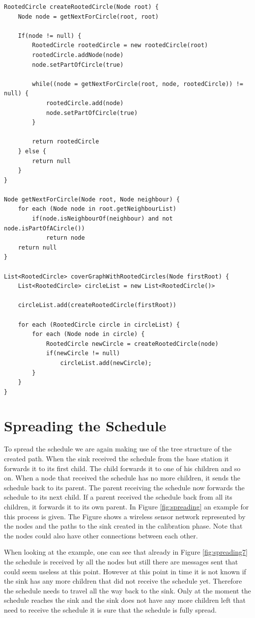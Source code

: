 \begin{lstlisting}
RootedCircle createRootedCircle(Node root) {
	Node node = getNextForCircle(root, root)	

	If(node != null) {
		RootedCircle rootedCircle = new rootedCircle(root)
		rootedCircle.addNode(node)
		node.setPartOfCircle(true)

		while((node = getNextForCircle(root, node, rootedCircle)) != null) {
			rootedCircle.add(node)
			node.setPartOfCircle(true)
		}

		return rootedCircle
	} else {
		return null
	}
}

Node getNextForCircle(Node root, Node neighbour) {
	for each (Node node in root.getNeighbourList)	
		if(node.isNeighbourOf(neighbour) and not node.isPartOfACircle())
			return node
	return null
}

List<RootedCircle> coverGraphWithRootedCircles(Node firstRoot) {
	List<RootedCircle> circleList = new List<RootedCircle()>
	
	circleList.add(createRootedCircle(firstRoot))

	for each (RootedCircle circle in circleList) {
		for each (Node node in circle) {
			RootedCircle newCircle = createRootedCircle(node)
			if(newCircle != null)
				circleList.add(newCircle);
		}
	}
}
\end{lstlisting}

\section{Spreading the Schedule}
\label{chp:apr_spreadingSchedule}
To spread the schedule we are again making use of the tree structure of the created path. When the sink received the schedule from the base station it forwards it to its first child. The child forwards it to one of his children and so on. When a node that received the schedule has no more children, it sends the schedule back to its parent. The parent receiving the schedule now forwards the schedule to its next child. If a parent received the schedule back from all its children, it forwards it to its own parent. In Figure \ref{fig:spreading} an example for this process is given. The Figure shows a wireless sensor network represented by the nodes and the paths to the sink created in the calibration phase. Note that the nodes could also have other connections between each other. 

When looking at the example, one can see that already in Figure \ref{fig:spreading7} the schedule is received by all the nodes but still there are messages sent that could seem useless at this point. However at this point in time it is not known if the sink has any more children that did not receive the schedule yet. Therefore the schedule needs to travel all the way back to the sink. Only at the moment the schedule reaches the sink and the sink does not have any more children left that need to receive the schedule it is sure that the schedule is fully spread.

